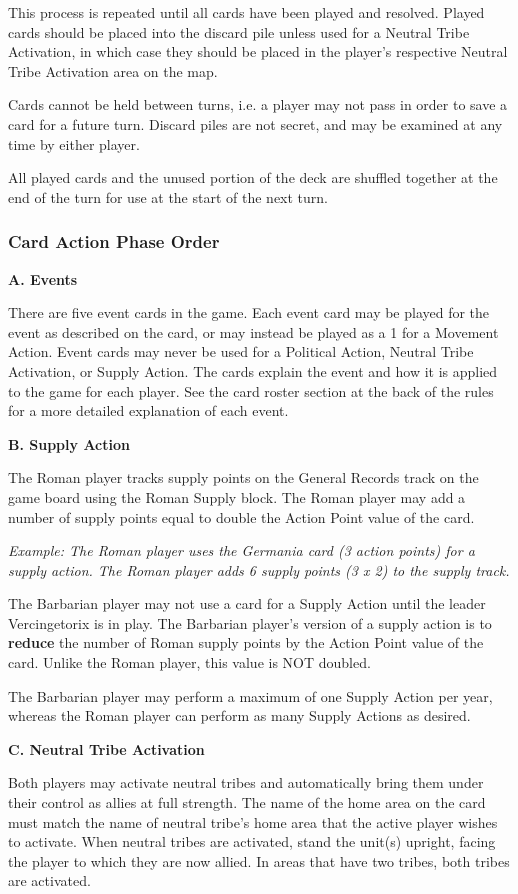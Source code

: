 This process is repeated until all cards have been played and resolved. Played cards should be placed into the discard pile unless used for a Neutral Tribe Activation, in which case they should be placed in the player's respective Neutral Tribe Activation area on the map.

Cards cannot be held between turns, i.e. a player may not pass in order to save a card for a future turn. Discard piles are not secret, and may be examined at any time by either player.

All played cards and the unused portion of the deck are shuffled together at the end of the turn for use at the start of the next turn.

\subsubsection{Card Action Phase Order}

\textbf{A. Events}
\par
There are five event cards in the game. Each event card may be played for the event as described on the card, or may instead be played as a 1 for a Movement Action. Event cards may never be used for a Political Action, Neutral Tribe Activation, or Supply Action. The cards explain the event and how it is applied to the game for each player. See the card roster section at the back of the rules for a more detailed explanation of each event.

\textbf{B. Supply Action}
\par
The Roman player tracks supply points on the General Records track on the game board using the Roman Supply block. The Roman player may add a number of supply points equal to double the Action Point value of the card.

\textit{Example: The Roman player uses the Germania card (3 action points) for a supply action. The Roman player adds 6 supply points (3 x 2) to the supply track.}

The Barbarian player may not use a card for a Supply Action until the leader Vercingetorix is in play. The Barbarian player's version of a supply action is to \textbf{reduce} the number of Roman supply points by the Action Point value of the card. Unlike the Roman player, this value is NOT doubled.

The Barbarian player may perform a maximum of one Supply Action per year, whereas the Roman player can perform as many Supply Actions as desired.

\textbf{C. Neutral Tribe Activation}
\par
Both players may activate neutral tribes and automatically bring them under their control as allies at full strength. The name of the home area on the card must match the name of neutral tribe's home area that the active player wishes to activate. When neutral tribes are activated, stand the unit(s) upright, facing the player to which they are now allied. In areas that have two tribes, both tribes are activated.

